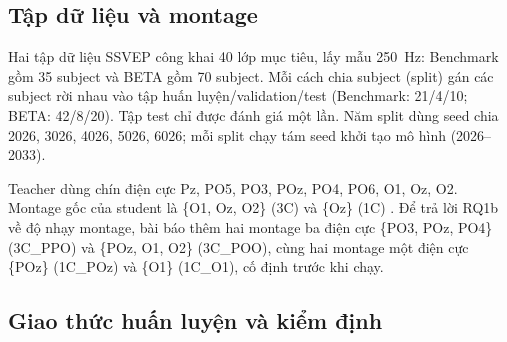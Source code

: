 \documentclass[11pt,a4paper,twoside,asymmetric]{article}
\begin{document}
\begin{table}[htbp]
\caption{Năm backbone và tính chất kiến trúc dùng làm biến giải thích ở RQ2. ELU: exponential linear unit, một hàm phi tuyến trơn. ``Bình phương, log'': hàm phi tuyến của ShallowConvNet bình phương đầu vào sau tích chập không gian rồi lấy log sau pooling, xấp xỉ đặc trưng công suất theo băng tần. Depthwise (tách kênh): tích chập không gian có một filter riêng cho mỗi kênh đầu vào, thay vì mỗi filter trải khắp mọi kênh (thường).}
\label{tab:backbones}
\begin{center}
\end{center}
\end{table}
\FloatBarrier

\subsection{Tập dữ liệu và montage}
\label{sec:data}

Hai tập dữ liệu SSVEP công khai 40 lớp mục tiêu, lấy mẫu 250~Hz: Benchmark gồm 35 subject và BETA gồm 70 subject. Mỗi cách chia subject (split) gán các subject rời nhau vào tập huấn luyện/validation/test (Benchmark: 21/4/10; BETA: 42/8/20). Tập test chỉ được đánh giá một lần. Năm split dùng seed chia 2026, 3026, 4026, 5026, 6026; mỗi split chạy tám seed khởi tạo mô hình (2026--2033).

Teacher dùng chín điện cực Pz, PO5, PO3, POz, PO4, PO6, O1, Oz, O2. Montage gốc của student là \{O1, Oz, O2\} (3C) và \{Oz\} (1C) \cite{R82}. Để trả lời RQ1b về độ nhạy montage, bài báo thêm hai montage ba điện cực \{PO3, POz, PO4\} (3C\_PPO) và \{POz, O1, O2\} (3C\_POO), cùng hai montage một điện cực \{POz\} (1C\_POz) và \{O1\} (1C\_O1), cố định trước khi chạy.

\subsection{Giao thức huấn luyện và kiểm định}
\label{sec:setup}
\end{document}

